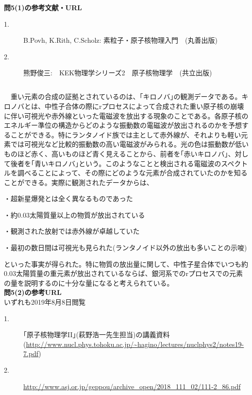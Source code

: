 \documentclass[a4j,fleqn]{jsarticle}
\begin{document}
        \textbf{問5(1)の参考文献・URL}
        \begin{description}
            \item[1.]B.Povh, K.Rith, C.Scholz: 素粒子・原子核物理入門　(丸善出版)
            \item[2.]熊野俊三:　KEK物理学シリーズ2　原子核物理学　(共立出版)
        \end{description}
        \newpage
        \setcounter{subsection}{2}
        \subsection{}
        　重い元素の合成の証拠とされているのは、｢キロノバ｣の観測データである。キロノバとは、中性子合体の際にrプロセスによって合成された重い原子核の崩壊に伴い可視光や赤外線といった電磁波を放出する現象のことである。各原子核のエネルギー準位の構造からどのような振動数の電磁波が放出されるのかを予想することができる。特にランタノイド族では主として赤外線が、それよりも軽い元素では可視光など比較的振動数の高い電磁波がみられる。光の色は振動数が低いものほど赤く、高いものほど青く見えることから、前者を｢赤いキロノバ｣、対して後者を｢青いキロノバ｣という。このようなことと検出される電磁波のスペクトルを調べることによって、その際にどのような元素が合成されていたのかを知ることができる。実際に観測されたデータからは、
        \begin{description}
            \item ・超新星爆発とは全く異なるものであった
            \item ・約0.03太陽質量以上の物質が放出されている
            \item ・観測された放射では赤外線が卓越していた
            \item ・最初の数日間は可視光も見られた(ランタノイド以外の放出も多いことの示唆)
        \end{description}
        といった事実が得られた。特に物質の放出量に関して、中性子星合体でいつも約0.03太陽質量の重元素が放出されているならば、銀河系でのrプロセスでの元素の量を説明するのに十分な量になると考えられている。\\
        \textbf{問5(2)の参考URL}\\
        いずれも2019年8月8日閲覧
        \begin{description}
            \item[1.] ｢原子核物理学II｣(萩野浩一先生担当)の講義資料(\url{http://www.nucl.phys.tohoku.ac.jp/~hagino/lectures/nuclphys2/notes19-7.pdf})
            \item[2.] \url{http://www.asj.or.jp/geppou/archive_open/2018_111_02/111-2_86.pdf}
        \end{description}
\end{document}
